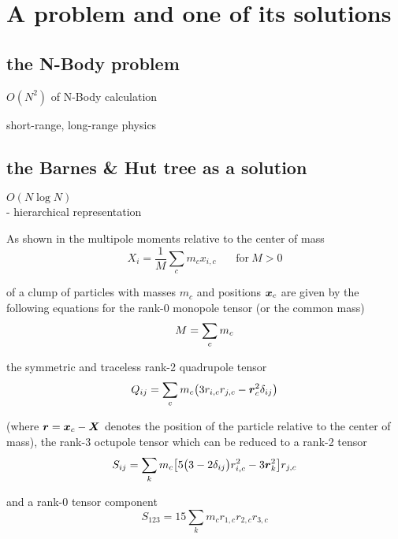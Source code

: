 
\section{A problem and one of its solutions}

\subsection{the N-Body problem}

$O(N^2)$ of N-Body calculation

short-range, long-range physics

\subsection{the Barnes \& Hut tree as a solution}

$O( N \log N )$\\
- hierarchical representation

As shown in \cite{1993ApJ...414..200M} the multipole moments relative to the center of mass 
\begin{equation}
X_{i} = \frac{1}{M} \sum_{c} m_{c} x_{i, c} ~~~~~~~~ \text{for}~M > 0
\end{equation}

of a clump of particles with masses $m_{c}$ and positions $\boldsymbol{x}_{c}$ are given by the following equations for the rank-0 monopole tensor (or the common mass)
\begin{equation}
M = \sum_{c} m_c \\
\end{equation}

the symmetric and traceless rank-2 quadrupole tensor 
\begin{equation}
Q_{ij} = \sum_{c} m_c \big( 3 r_{i, c} r_{j, c} - \boldsymbol{r}_{c}^2 \delta_{i j} \big) \\
\end{equation}

(where $\boldsymbol{r} = \boldsymbol{x}_{c} - \boldsymbol{X} $ denotes the position of the particle relative to the center of mass), the rank-3 octupole tensor which can be reduced to a rank-2 tensor
\begin{equation}
S_{ij}  = \sum_{k} m_c \big[ 5 \big( 3 - 2  \delta_{i j} \big) r_{i, c}^2 - 3 \boldsymbol{r}_{k}^2 \big] r_{j, c}\\
\end{equation}

and a rank-0 tensor component
\begin{equation}
S_{1 2 3} = 15 \sum_{k} m_c r_{1, c} r_{2, c} r_{3, c}
\end{equation}

